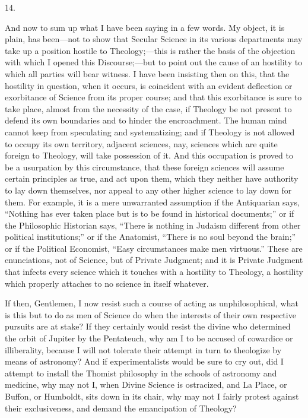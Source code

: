14.

And now to sum up what I have been saying in a few words. My
object, it is plain, has been—not to show that Secular Science in
its various departments may take up a position hostile to Theology;—this
is rather the basis of the objection with which I opened this
Discourse;—but to point out the cause of an hostility to which all
parties will bear witness. I have been insisting then on this, that
the hostility in question, when it occurs, is coincident with an
evident deflection or exorbitance of Science from its proper course;
and that this exorbitance is sure to take place, almost from the
necessity of the case, if Theology be not present to defend its own
boundaries and to hinder the encroachment. The human mind cannot keep
from speculating and systematizing; and if Theology is not allowed to
occupy its own territory, adjacent sciences, nay, sciences which are
quite foreign to Theology, will take possession of it. And this
occupation is proved to be a usurpation by this circumstance, that
these foreign sciences will assume certain principles as true,
and act upon them, which they neither have authority to lay down
themselves, nor appeal to any other higher science to lay down for
them. For example, it is a mere unwarranted assumption if the
Antiquarian says, ``Nothing has ever taken place but is to be
found in historical documents;'' or if the Philosophic Historian
says, ``There is nothing in Judaism different from other political
institutions;'' or if the Anatomist, ``There is no soul beyond
the brain;'' or if the Political Economist, ``Easy
circumstances make men virtuous.'' These are enunciations, not of
Science, but of Private Judgment; and it is Private Judgment that
infects every science which it touches with a hostility to Theology, a
hostility which properly attaches to no science in itself whatever.

If then, Gentlemen, I now resist such a course of acting as
unphilosophical, what is this but to do as men of Science do when the
interests of their own respective pursuits are at stake? If they
certainly would resist the divine who determined the orbit of Jupiter
by the Pentateuch, why am I to be accused of cowardice or
illiberality, because I will not tolerate their attempt in turn to
theologize by means of astronomy? And if experimentalists would be
sure to cry out, did I attempt to install the Thomist philosophy in
the schools of astronomy and medicine, why may not I, when Divine
Science is ostracized, and La Place, or Buffon, or Humboldt, sits down
in its chair, why may not I fairly protest against their
exclusiveness, and demand the emancipation of Theology?

